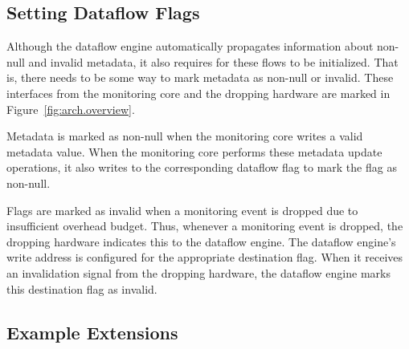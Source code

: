 \subsection{Setting Dataflow Flags}
\label{sec:arch.dropping}

Although the dataflow engine automatically propagates information about
non-null and invalid metadata, it also requires for these flows to be
initialized. That is, there needs to be some way to mark metadata as non-null
or invalid. These interfaces from the monitoring core and the dropping hardware
are marked in Figure~\ref{fig:arch.overview}.

Metadata is marked as non-null when the monitoring core writes a valid metadata
value. When the monitoring core performs these metadata update operations, it
also writes to the corresponding dataflow flag to mark the flag as non-null.

Flags are marked as invalid when a monitoring event is dropped due to
insufficient overhead budget. Thus, whenever a monitoring event is dropped, the
dropping hardware indicates this to the dataflow engine. The dataflow engine's
write address is configured for the appropriate destination flag. When it
receives an invalidation signal from the dropping hardware, the
dataflow engine marks this destination flag as invalid.

\subsection{Example Extensions}
